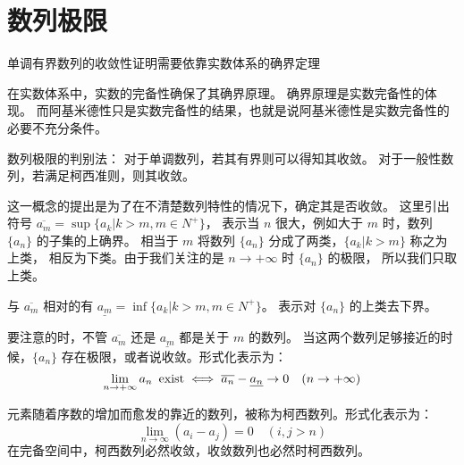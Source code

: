 
\section{数列极限}
\begin{exposition}
    单调有界数列的收敛性证明需要依靠实数体系的确界定理
\end{exposition}

\begin{exposition}
    在实数体系中，实数的完备性确保了其确界原理。
    确界原理是实数完备性的体现。
    而阿基米德性只是实数完备性的结果，也就是说阿基米德性是实数完备性的必要不充分条件。
\end{exposition}

\begin{exposition}
    数列极限的判别法：
    对于单调数列，若其有界则可以得知其收敛。
    对于一般性数列，若满足柯西准则，则其收敛。
\end{exposition}

\begin{exposition}[上下极限]
    这一概念的提出是为了在不清楚数列特性的情况下，确定其是否收敛。
    这里引出符号 $\overline{a_m} = \sup{\{a_k | k > m, m \in N^+\}}$，
    表示当 $n$ 很大，例如大于 $m$ 时，数列 $\{a_n\}$ 的子集的上确界。
    相当于 $m$ 将数列 $\{a_n\}$ 分成了两类，$\{a_k | k > m\}$ 称之为上类，
    相反为下类。由于我们关注的是 $n \to +\infty$ 时 $\{a_n\}$ 的极限，
    所以我们只取上类。

    与 $\overline{a_m}$ 相对的有 $\underline{a_m} = \inf{\{a_k | k > m, m \in N^+\}}$。
    表示对 $\{a_n\}$ 的上类去下界。

    要注意的时，不管 $\overline{a_m}$ 还是 $\underline{a_m}$ 都是关于 $m$ 的数列。
    当这两个数列足够接近的时候，$\{a_n\}$ 存在极限，或者说收敛。形式化表示为：
    \begin{equation}
        \lim_{n \to +\infty}{a_n} \text{\, exist} \iff 
        \overline{a_n} - \underline{a_n} \to 0 \quad (n \to +\infty)
    \end{equation}
\end{exposition}

\begin{exposition}[柯西准则]
    元素随着序数的增加而愈发的靠近的数列，被称为柯西数列。形式化表示为：
    \begin{equation}
        \lim_{n\to\infty}{(a_i - a_j)} = 0 \quad (i,j > n)
    \end{equation}
    在完备空间中，柯西数列必然收敛，收敛数列也必然时柯西数列。
\end{exposition}

